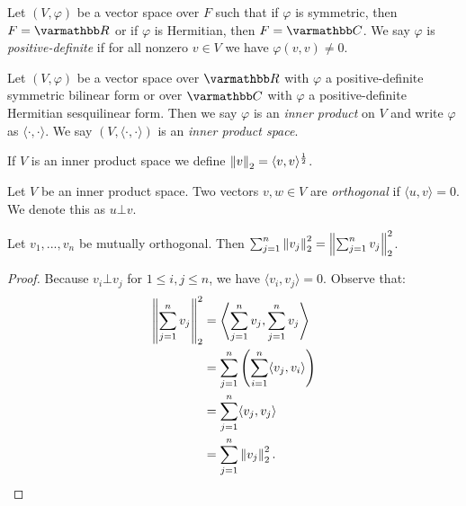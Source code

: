     \begin{definition}
        Let $(V,\varphi)$ be a vector space over $F$ such that if $\varphi$ is symmetric, then $F = \bfR$ or if $\varphi$ is Hermitian, then $F = \bfC$. We say $\varphi$ is \textit{positive-definite} if for all nonzero $v \in V$ we have $\varphi(v,v) \neq 0$.
    \end{definition}

    \begin{definition}


        Let $(V,\varphi)$ be a vector space over $\bfR$ with $\varphi$ a positive-definite symmetric bilinear form or over $\bfC$ with $\varphi$ a positive-definite Hermitian sesquilinear form. Then we say $\varphi$ is an \textit{inner product} on $V$ and write $\varphi$ as $\langle \cdot,\cdot \rangle$. We say $(V,\langle \cdot,\cdot \rangle)$ is an \textit{inner product space}.
    \end{definition}

    \begin{center}
    \end{center}
    
    \begin{definition}
        If $V$ is an inner product space we define $\left\lVert v \right\rVert_2 = \langle v,v \rangle^\frac{1}{2}$.
    \end{definition}

    \begin{definition}
        Let $V$ be an inner product space. Two vectors $v,w \in V$ are \textit{orthogonal} if $\langle u,v \rangle = 0$. We denote this as $u \bot v$.
    \end{definition}

    \begin{theorem}
        Let $v_1,...,v_n$ be mutually orthogonal. Then $\sum_{j = 1}^n \left\lVert v_j \right\rVert_2^2 = \left\lVert \sum_{j = 1}^n v_j \right\rVert_2^2$.
    \end{theorem}
        \begin{proof}
            Because $v_i \bot v_j$ for $1 \leq i,j \leq n$, we have $\langle v_i,v_j \rangle = 0$. Observe that:
                \begin{equation*}
                \begin{split}
                    \left\lVert \sum_{j = 1}^n v_j \right\rVert_2^2
                    & = \Biggl< \sum_{j = 1}^n v_j , \sum_{j = 1}^n v_j \Biggr> \\
                    & = \sum_{j = 1}^n \left( \sum_{i = 1}^n \langle v_j,v_i \rangle \right) \\
                    & = \sum_{j =1}^n \langle v_j,v_j \rangle \\
                    & = \sum_{j = 1}^n \left\lVert v_j \right\rVert_2^2.
                \end{split}
                \end{equation*}
        \end{proof}
    
